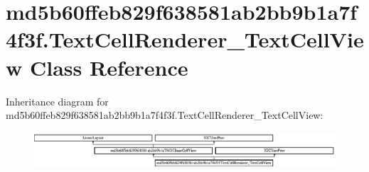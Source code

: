 \hypertarget{classmd5b60ffeb829f638581ab2bb9b1a7f4f3f_1_1TextCellRenderer__TextCellView}{}\section{md5b60ffeb829f638581ab2bb9b1a7f4f3f.\+Text\+Cell\+Renderer\+\_\+\+Text\+Cell\+View Class Reference}
\label{classmd5b60ffeb829f638581ab2bb9b1a7f4f3f_1_1TextCellRenderer__TextCellView}
Inheritance diagram for md5b60ffeb829f638581ab2bb9b1a7f4f3f.\+Text\+Cell\+Renderer\+\_\+\+Text\+Cell\+View\+:\begin{figure}[H]
\begin{center}
\leavevmode
\includegraphics[height=1.299304cm]{classmd5b60ffeb829f638581ab2bb9b1a7f4f3f_1_1TextCellRenderer__TextCellView}
\end{center}
\end{figure}
